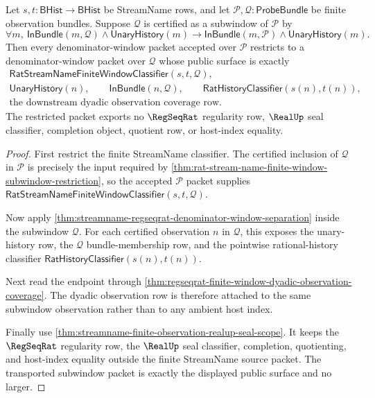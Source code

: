 \begin{theorem}
\label{thm:streamname-regseqrat-denominator-subwindow-transport}
Let $s,t:\mathsf{BHist}\to\mathsf{BHist}$ be StreamName rows, and let
$\mathcal P,\mathcal Q:\mathsf{ProbeBundle}$ be finite observation bundles.
Suppose $\mathcal Q$ is certified as a subwindow of $\mathcal P$ by
$$
\forall m,\ \mathsf{InBundle}(m,\mathcal Q)\land\mathsf{UnaryHistory}(m)
\to
\mathsf{InBundle}(m,\mathcal P)\land\mathsf{UnaryHistory}(m).
$$
Then every denominator-window packet accepted over $\mathcal P$ restricts to a
denominator-window packet over $\mathcal Q$ whose public surface is exactly
$$
\begin{gathered}
\mathsf{RatStreamNameFiniteWindowClassifier}(s,t,\mathcal Q),\\
\mathsf{UnaryHistory}(n),\qquad
\mathsf{InBundle}(n,\mathcal Q),\qquad
\mathsf{RatHistoryClassifier}(s(n),t(n)),\\
\text{the downstream dyadic observation coverage row.}
\end{gathered}
$$
The restricted packet exports no $\RegSeqRat$ regularity row, $\RealUp$ seal
classifier, completion object, quotient row, or host-index equality.
\end{theorem}
\begin{proof}
First restrict the finite StreamName classifier. The certified inclusion of
$\mathcal Q$ in $\mathcal P$ is precisely the input required by
\autoref{thm:rat-stream-name-finite-window-subwindow-restriction}, so the
accepted $\mathcal P$ packet supplies
$\mathsf{RatStreamNameFiniteWindowClassifier}(s,t,\mathcal Q)$.

Now apply
\autoref{thm:streamname-regseqrat-denominator-window-separation} inside the
subwindow $\mathcal Q$. For each certified observation $n$ in $\mathcal Q$, this
exposes the unary-history row, the $\mathcal Q$ bundle-membership row, and the
pointwise rational-history classifier $\mathsf{RatHistoryClassifier}(s(n),t(n))$.

Next read the endpoint through
\autoref{thm:regseqrat-finite-window-dyadic-observation-coverage}. The dyadic
observation row is therefore attached to the same subwindow observation rather
than to any ambient host index.

Finally use
\autoref{thm:streamname-finite-observation-realup-seal-scope}. It keeps the
$\RegSeqRat$ regularity row, the $\RealUp$ seal classifier, completion,
quotienting, and host-index equality outside the finite StreamName source
packet. The transported subwindow packet is exactly the displayed public
surface and no larger.
\end{proof}

